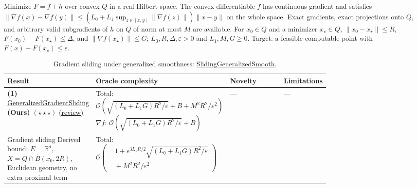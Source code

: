 \begin{table}[tp]
\centering
\caption{Gradient sliding under generalized smoothness: \href{https://github.com/k3nfalt/longtails/blob/main/LongTails/Setups/SlidingGeneralizedSmooth.lean}{Sliding\allowbreak{}Generalized\allowbreak{}Smooth}.}\label{tab:SlidingGeneralizedSmooth}
\parbox{\linewidth}{\footnotesize Minimize $F=f+h$ over convex $Q$ in a real Hilbert space. The convex differentiable $f$ has continuous gradient and satisfies $\|\nabla f(x)-\nabla f(y)\|\le (L_0+L_1\sup_{z\in[x,y]}\|\nabla f(z)\|)\|x-y\|$ on the whole space. Exact gradients, exact projections onto $Q$, and arbitrary valid subgradients of $h$ on $Q$ of norm at most $M$ are available. For $x_0\in Q$ and a minimizer $x_\star\in Q$, $\|x_0-x_\star\|\le R$, $F(x_0)-F(x_\star)\le\Delta$, and $\|\nabla f(x_\star)\|\le G$; $L_0,R,\Delta,\varepsilon>0$ and $L_1,M,G\ge0$. Target: a feasible computable point with $F(x)-F(x_\star)\le\varepsilon$.}\par\smallskip
\begin{threeparttable}
\footnotesize
\setlength{\tabcolsep}{4pt}\renewcommand{\arraystretch}{1.25}
\begin{tabularx}{\linewidth}{@{}>{\raggedright\arraybackslash}p{0.20\linewidth}>{\raggedright\arraybackslash}p{0.32\linewidth}>{\raggedright\arraybackslash}p{0.25\linewidth}>{\raggedright\arraybackslash}X@{}}
\toprule
\textbf{Result} & \textbf{Oracle complexity} & \textbf{Novelty} & \textbf{Limitations} \\
\midrule
\textbf{(1)} \href{https://github.com/k3nfalt/longtails/blob/main/LongTails/Theorems/GeneralizedGradientSliding.lean}{Generalized\allowbreak{}Gradient\allowbreak{}Sliding} \textbf{(Ours)} $(\star\star\star)$ \href{https://github.com/k3nfalt/longtails/blob/main/scripts/reviews/GeneralizedGradientSliding.md}{(review)}
& Total: $\mathcal{O}\!\left(\sqrt{(L_0+L_1G)R^2/\varepsilon}+B+M^2R^2/\varepsilon^2\right)$\newline
$\nabla f$: $\mathcal{O}\!\left(\sqrt{(L_0+L_1G)R^2/\varepsilon}+B\right)$
& ---
& --- \\
\midrule[1.2pt]
Gradient sliding \citep[Cor.~1(a)]{sgsLan2016v2}\newline Derived bound: $E=\mathbb{R}^d$, $X=Q\cap\overline B(x_0,2R)$, Euclidean geometry, no extra proximal term
& Total: $\displaystyle\mathcal{O}\!\left(\begin{aligned}&1+e^{3L_1R/2}\sqrt{(L_0+L_1G)R^2/\varepsilon}\\&{}+M^2R^2/\varepsilon^2\end{aligned}\right)$\newline

\end{tabularx}
\end{threeparttable}
\end{table}
